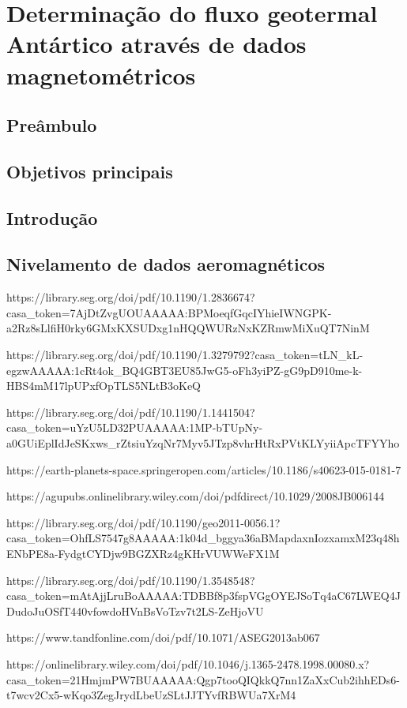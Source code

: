 \documentclass[11pt,a4paper,oneside]{book}
\begin{document}
\chapter{Determinação do fluxo geotermal Antártico através de dados magnetométricos}

\section{Preâmbulo}

\section{Objetivos principais}

\section{Introdução}

\section{Nivelamento de dados aeromagnéticos}

https://library.seg.org/doi/pdf/10.1190/1.2836674?casa_token=7AjDtZvgUOUAAAAA:BPMoeqfGqcIYhieIWNGPK-a2Rz8sLlfiH0rky6GMxKXSUDxg1nHQQWURzNxKZRmwMiXuQT7NinM

https://library.seg.org/doi/pdf/10.1190/1.3279792?casa_token=tLN_kL-egzwAAAAA:1cRt4ok_BQ4GBT3EU85JwG5-oFh3yiPZ-gG9pD910me-k-HBS4mM17lpUPxfOpTLS5NLtB3oKeQ

https://library.seg.org/doi/pdf/10.1190/1.1441504?casa_token=uYzU5LD32PUAAAAA:1MP-bTUpNy-a0GUiEplIdJeSKxws_rZtsiuYzqNr7Myv5JTzp8vhrHtRxPVtKLYyiiApcTFYYho

https://earth-planets-space.springeropen.com/articles/10.1186/s40623-015-0181-7

https://agupubs.onlinelibrary.wiley.com/doi/pdfdirect/10.1029/2008JB006144

https://library.seg.org/doi/pdf/10.1190/geo2011-0056.1?casa_token=OhfLS7547g8AAAAA:1k04d_bggya36aBMapdaxnIozxamxM23q48hENbPE8a-FydgtCYDjw9BGZXRz4gKHrVUWWeFX1M

https://library.seg.org/doi/pdf/10.1190/1.3548548?casa_token=mAtAjjLruBoAAAAA:TDBBf8p3fspVGgOYEJSoTq4aC67LWEQ4JDudoJuOSfT440vfowdoHVnBsVoTzv7t2LS-ZeHjoVU

https://www.tandfonline.com/doi/pdf/10.1071/ASEG2013ab067

https://onlinelibrary.wiley.com/doi/pdf/10.1046/j.1365-2478.1998.00080.x?casa_token=21HmjmPW7BUAAAAA:Qgp7tooQIQkkQ7nn1ZaXxCub2ihhEDs6-t7wcv2Cx5-wKqo3ZegJrydLbeUzSLtJJTYvfRBWUa7XrM4
\end{document}
